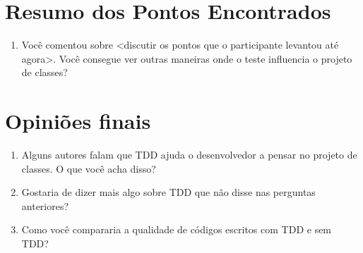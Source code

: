 \section{Resumo dos Pontos Encontrados}

\begin{enumerate}
	\item Você comentou sobre <discutir os pontos que o participante levantou até agora>. Você
	consegue ver outras maneiras onde o teste influencia o projeto de classes?
\end{enumerate}

\section{Opiniões finais}

\begin{enumerate}
	\item Alguns autores falam que TDD ajuda o desenvolvedor a pensar no projeto de classes. O que você acha disso?

	\item Gostaria de dizer mais algo sobre TDD que não disse nas perguntas anteriores?
	
	\item Como você compararia a qualidade de códigos escritos com TDD e sem TDD? 

\end{enumerate}
